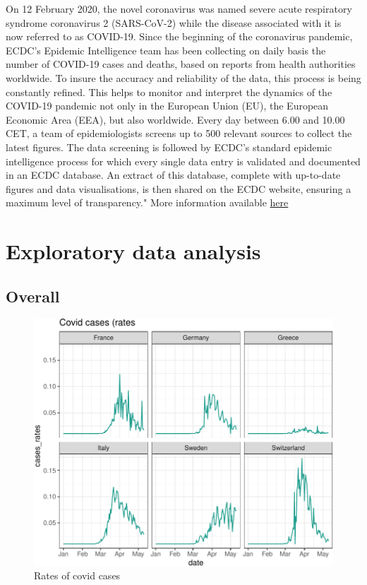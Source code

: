 \documentclass[11pt,a4paper,]{article}
\begin{document}
On 12 February 2020, the novel coronavirus was named severe acute respiratory syndrome coronavirus 2 (SARS-CoV-2) while the disease associated with it is now referred to as COVID-19. Since the beginning of the coronavirus pandemic, ECDC's Epidemic Intelligence team has been collecting on daily basis the number of COVID-19 cases and deaths, based on reports from health authorities worldwide. To insure the accuracy and reliability of the data, this process is being constantly refined. This helps to monitor and interpret the dynamics of the COVID-19 pandemic not only in the European Union (EU), the European Economic Area (EEA), but also worldwide. Every day between 6.00 and 10.00 CET, a team of epidemiologists screens up to 500 relevant sources to collect the latest figures. The data screening is followed by ECDC's standard epidemic intelligence process for which every single data entry is validated and documented in an ECDC database. An extract of this database, complete with up-to-date figures and data visualisations, is then shared on the ECDC website, ensuring a maximum level of transparency." More information available \href{https://data.europa.eu/euodp/en/data/dataset/covid-19-coronavirus-data}{here}

\hypertarget{exploratory-data-analysis}{%
\section{Exploratory data analysis}\label{exploratory-data-analysis}}

\hypertarget{overall}{%
\subsection{Overall}\label{overall}}

\begin{figure}

{\centering \includegraphics{Example_files/figure-latex/covid-europe-1} 

}

\caption{Rates of covid cases}\label{fig:covid-europe}
\end{figure}
\end{document}
